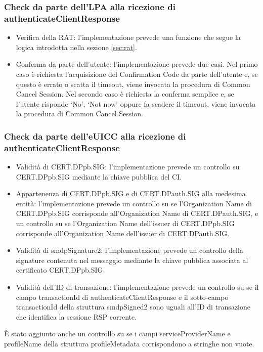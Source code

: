 \documentclass[10pt, oneside]{book}
\begin{document}
\subsubsection{Check da parte dell'LPA alla ricezione di authenticateClientResponse}
\begin{itemize}
\item Verifica della RAT: l'implementazione prevede una funzione che segue la logica introdotta nella sezione \ref{sec:rat}.
\item Conferma da parte dell'utente: l'implementazione prevede due casi. Nel primo caso è richiesta l'acquisizione del Confirmation Code da parte dell'utente e, se questo è errato o scatta il timeout, viene invocata la procedura di Common Cancel Session. Nel secondo caso è richiesta la conferma semplice e, se l'utente risponde `No', `Not now' oppure fa scadere il timeout, viene invocata la procedura di Common Cancel Session.
\end{itemize}

\subsubsection{Check da parte dell'eUICC alla ricezione di authenticateClientResponse}
\begin{itemize}
\item Validità di CERT.DPpb.SIG: l'implementazione prevede un controllo su CERT.DPpb.SIG mediante la chiave pubblica del CI.
\item Appartenenza di CERT.DPpb.SIG e di CERT.DPauth.SIG alla medesima entità: l'implementazione prevede un controllo su se l'Organization Name di CERT.DPpb.SIG corrisponde all'Organization Name di CERT.DPauth.SIG, e un controllo su se l'Organization Name dell'issuer di CERT.DPpb.SIG corrisponde all'Organization Name dell'issuer di CERT.DPauth.SIG.
\item Validità di smdpSignature2: l'implementazione prevede un controllo della signature contenuta nel messaggio mediante la chiave pubblica associata al certificato CERT.DPpb.SIG.
\item Validità dell'ID di transazione: l'implementazione prevede un controllo su se il campo transactionId di authenticateClientResponse e il sotto-campo transactionId della struttura smdpSigned2 sono uguali all'ID di transazione che identifica la sessione RSP corrente.
\end{itemize}
È stato aggiunto anche un controllo su se i campi serviceProviderName e profileName della struttura profileMetadata corrispondono a stringhe non vuote.
\end{document}
